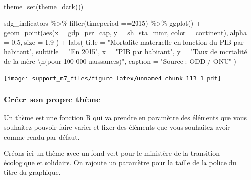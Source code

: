 \documentclass[
]{book}
\newenvironment{Shaded}{\begin{snugshade}}{\end{snugshade}}
\newcommand{\AttributeTok}[1]{\textcolor[rgb]{0.77,0.63,0.00}{#1}}
\newcommand{\DecValTok}[1]{\textcolor[rgb]{0.00,0.00,0.81}{#1}}
\newcommand{\FloatTok}[1]{\textcolor[rgb]{0.00,0.00,0.81}{#1}}
\newcommand{\FunctionTok}[1]{\textcolor[rgb]{0.00,0.00,0.00}{#1}}
\newcommand{\NormalTok}[1]{#1}
\newcommand{\SpecialCharTok}[1]{\textcolor[rgb]{0.00,0.00,0.00}{#1}}
\newcommand{\StringTok}[1]{\textcolor[rgb]{0.31,0.60,0.02}{#1}}
\begin{document}
\begin{Shaded}
\begin{Highlighting}[]
\FunctionTok{theme\_set}\NormalTok{(}\FunctionTok{theme\_dark}\NormalTok{())}

\NormalTok{sdg\_indicators }\SpecialCharTok{\%\textgreater{}\%} 
  \FunctionTok{filter}\NormalTok{(timeperiod }\SpecialCharTok{==}\DecValTok{2015}\NormalTok{) }\SpecialCharTok{\%\textgreater{}\%} 
  \FunctionTok{ggplot}\NormalTok{() }\SpecialCharTok{+}
  \FunctionTok{geom\_point}\NormalTok{(}\FunctionTok{aes}\NormalTok{(}\AttributeTok{x =}\NormalTok{ gdp\_per\_cap, }
                 \AttributeTok{y =}\NormalTok{ sh\_sta\_mmr,}
                 \AttributeTok{color =}\NormalTok{ continent),}
    \AttributeTok{alpha =} \FloatTok{0.5}\NormalTok{, }
    \AttributeTok{size =} \FloatTok{1.9}
\NormalTok{  ) }\SpecialCharTok{+}
  \FunctionTok{labs}\NormalTok{(}
    \AttributeTok{title =} \StringTok{"Mortalité maternelle en fonction du PIB par habitant"}\NormalTok{,}
    \AttributeTok{subtitle =} \StringTok{"En 2015"}\NormalTok{,}
    \AttributeTok{x =} \StringTok{"PIB par habitant"}\NormalTok{,}
    \AttributeTok{y =} \StringTok{"Taux de mortalité de la mère }\SpecialCharTok{\textbackslash{}n}\StringTok{(pour 100 000 naissances)"}\NormalTok{,}
    \AttributeTok{caption =} \StringTok{"Source : ODD / ONU"}
\NormalTok{  )}
\end{Highlighting}
\end{Shaded}

\texttt{[image: support\_m7\_files/figure-latex/unnamed-chunk-113-1.pdf]}

\hypertarget{cruxe9er-son-propre-thuxe8me}{%
\subsubsection{Créer son propre thème}\label{cruxe9er-son-propre-thuxe8me}}

Un thème est une fonction R qui va prendre en paramètre des éléments que vous souhaitez pouvoir faire varier et fixer des éléments que vous souhaitez avoir comme rendu par défaut.

Créons ici un thème avec un fond vert pour le ministère de la transition écologique et solidaire. On rajoute un paramètre pour la taille de la police du titre du graphique.
\end{document}
